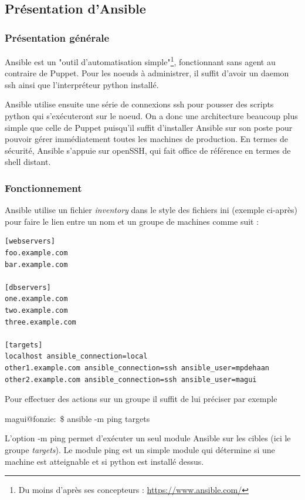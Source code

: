 \documentclass[14 pt,a4paper]{extreport}
\begin{document}
\subsection{Présentation d'Ansible}

\subsubsection{Présentation générale}
Ansible est un "outil d'automatisation simple"\footnote{Du moins d'après ses concepteurs : \url{https://www.ansible.com/}}, fonctionnant sans agent au contraire de Puppet. Pour les noeuds à administrer, il suffit d'avoir un daemon ssh ainsi que l'interpréteur python installé. 

Ansible utilise ensuite une série de connexions ssh pour pousser des scripts python qui s'exécuteront sur le noeud. On a donc une architecture beaucoup plus simple que celle de Puppet puisqu'il suffit d'installer Ansible sur son poste pour pouvoir gérer immédiatement toutes les machines de production. En termes de sécurité, Ansible s'appuie sur openSSH, qui fait office de référence en termes de shell distant.

\subsubsection{Fonctionnement}

Ansible utilise un fichier \emph{inventory} dans le style des fichiers ini (exemple ci-après) pour faire le lien entre un nom et un groupe de machines comme suit :
\newpage
\begin{framed}
\begin{Verbatim}[fontsize=\scriptsize]
[webservers]
foo.example.com
bar.example.com

[dbservers]
one.example.com
two.example.com
three.example.com

[targets]
localhost ansible_connection=local
other1.example.com ansible_connection=ssh ansible_user=mpdehaan
other2.example.com ansible_connection=ssh ansible_user=magui
\end{Verbatim}
\end{framed}
Pour effectuer des actions sur un groupe il suffit de lui préciser par exemple \begin{framed}magui@fonzie:~\$ ansible -m ping targets\end{framed}

L'option -m ping permet d'exécuter un seul module Ansible sur les cibles (ici le groupe \emph{targets}). Le module ping est un simple module qui détermine si une machine est atteignable et si python est installé dessus.
\end{document}
